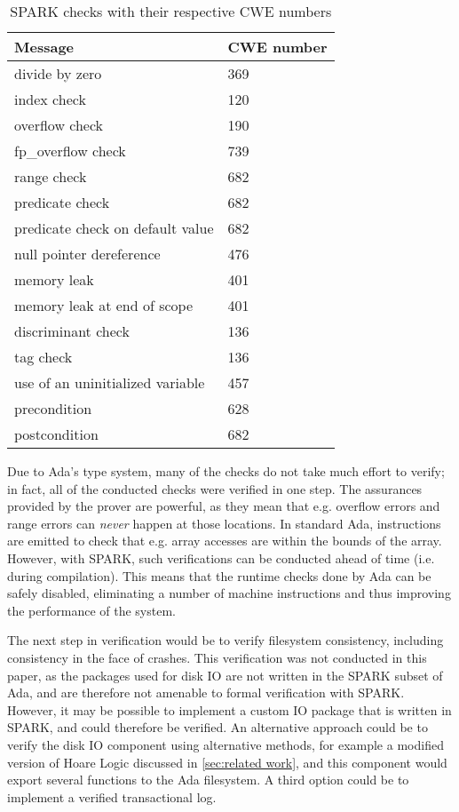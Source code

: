 \begin{table}[tb]
  \centering
  \vspace{1em}
  \renewcommand{\arraystretch}{1.5}
  \begin{tabular}{| l | l |}
    \hline
    \textbf{Message} & \textbf{CWE number} \\ \hline
    divide by zero & 369 \\ \hline
    index check & 120 \\ \hline
    overflow check & 190 \\ \hline
    fp\_overflow check & 739 \\ \hline
    range check & 682 \\ \hline
    predicate check & 682 \\ \hline
    predicate check on default value & 682 \\ \hline
    null pointer dereference & 476 \\ \hline
    memory leak & 401 \\ \hline
    memory leak at end of scope & 401 \\ \hline
    discriminant check & 136 \\ \hline
    tag check & 136 \\ \hline
    use of an uninitialized variable & 457 \\ \hline
    precondition & 628 \\ \hline
    postcondition & 682 \\ \hline
  \end{tabular}
  \renewcommand{\arraystretch}{1}
  \vspace{1em}
  \caption{SPARK checks with their respective CWE numbers}
  \label{tab:checks and cwe numbers}
\end{table}

Due to Ada's type system, many of the checks do not take much effort to verify; in fact, all of the conducted checks were verified in one step.
The assurances provided by the prover are powerful, as they mean that e.g. overflow errors and range errors can \textit{never} happen at those locations.
In standard Ada, instructions are emitted to check that e.g. array accesses are within the bounds of the array.
However, with SPARK, such verifications can be conducted ahead of time (i.e. during compilation).
This means that the runtime checks done by Ada can be safely disabled, eliminating a number of machine instructions and thus improving the performance of the system.

The next step in verification would be to verify filesystem consistency, including consistency in the face of crashes.
This verification was not conducted in this paper, as the packages used for disk IO are not written in the SPARK subset of Ada, and are therefore not amenable to formal verification with SPARK.
However, it may be possible to implement a custom IO package that is written in SPARK, and could therefore be verified.
An alternative approach could be to verify the disk IO component using alternative methods, for example a modified version of Hoare Logic discussed in \autoref{sec:related work}, and this component would export several functions to the Ada filesystem.
A third option could be to implement a verified transactional log.

